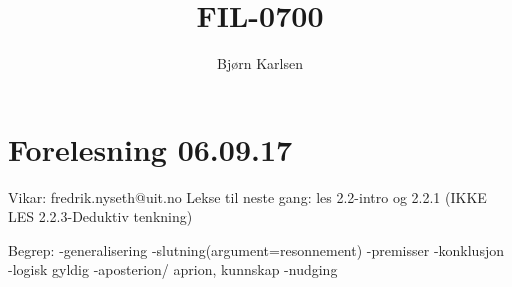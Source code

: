 \documentclass[11pt]{article}
\title{\textbf{FIL-0700}}
\author{Bjørn Karlsen}
\date{}
\begin{document}
\maketitle

\section{Forelesning 06.09.17}
Vikar: fredrik.nyseth@uit.no
Lekse til neste gang: les 2.2-intro og 2.2.1 (IKKE LES 2.2.3-Deduktiv tenkning)

Begrep: -generalisering
		-slutning(argument=resonnement)
		-premisser
		-konklusjon
		-logisk gyldig
		-aposterion/ aprion, kunnskap
		-nudging
\end{document}
